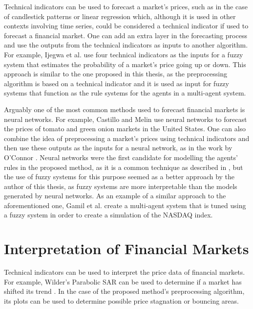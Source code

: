 Technical indicators can be used to forecast a market's prices, such as in the
case of candlestick patterns \cite{Nison1991} or linear regression
\cite{kutner2004applied} which, although it is used in other contexts involving
time series, could be considered a technical indicator if used to forecast a
financial market. One can add an extra layer in the forecasting process and use
the outputs from the technical indicators as inputs to another algorithm. For
example, Ijegwa et al. \cite{Ijegwa2014} use four technical indicators as the
inputs for a fuzzy system that estimates the probability of a market's price
going up or down. This approach is similar to the one proposed in this thesis,
as the preprocessing algorithm is based on a technical indicator and it is used
as input for fuzzy systems that function as the rule systems for the agents in a
multi-agent system.

Arguably one of the most common methods used to forecast financial markets is
neural networks. For example, Castillo and Melin \cite{Castillo2001}
\cite{melin2007hybrid} use neural networks to forecast the prices of tomato and
green onion markets in the United States. One can also combine the idea of
preprocessing a market's prices using technical indicators and then use these
outputs as the inputs for a neural network, as in the work by O'Connor
\cite{Connor2005}. Neural networks were the first candidate for modelling the
agents' rules in the proposed method, as it is a common technique as described
in \cite{Grothmann2002}, but the use of fuzzy systems for this purpose seemed as
a better approach by the author of this thesis, as fuzzy systems are more
interpretable than the models generated by neural networks. As an example of a
similar approach to the aforementioned one, Gamil et al. \cite{Gamil2007} create
a multi-agent system that is tuned using a fuzzy system in order to create a
simulation of the NASDAQ index.

\section{Interpretation of Financial Markets}
\label{section:interpretation-of-financial-markets}

Technical indicators can be used to interpret the price data of financial
markets. For example, Wilder's Parabolic SAR can be used to determine if a
market has shifted its trend \cite{Wilder1978}. In the case of the proposed
method's preprocessing algorithm, its plots can be used to determine possible
price stagnation or bouncing areas.

